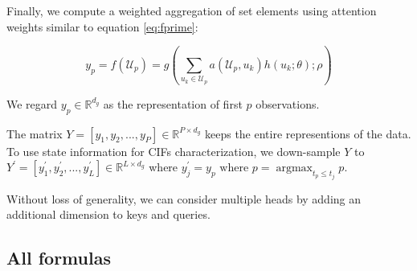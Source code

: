 \documentclass[journal,twoside,web]{ieeecolor}
\DeclareMathOperator*{\argmax}{argmax} %
\begin{document}
Finally, we compute a weighted aggregation of set elements using attention weights similar to equation \ref*{eq:fprime}:

\begin{equation*}
    y_p=f(\mathcal{U}_p) =     
    g\left(
    \sum_{u_k \in \mathcal{U}_p}  a(\mathcal{U}_p,u_k)h(u_k;\theta);\rho 
    \right) 
\end{equation*}

We regard $y_p \in \mathbb{R}^{d_g}$ as the representation of first $p$ observations.

The matrix $Y=[y_1,y_2,...,y_P] \in \mathbb{R}^{P \times d_g}$ keeps the entire representions of the data. To use state information for CIFs characterization, we down-sample $Y$ to $Y^{\prime}=[y^{\prime}_1,y^{\prime}_2,...,y^{\prime}_L]  \in \mathbb{R}^{L \times d_g}$ where $ y^{\prime}_j=y_p \text{ where } p=\argmax_{t_p \leq t_j} p$.

Without loss of generality, we can consider multiple heads by adding an additional dimension to keys and queries.










\subsection{All formulas}







\end{document}
